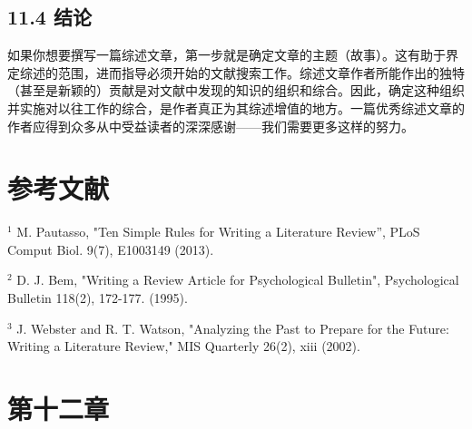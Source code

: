 \subsection*{11.4 结论}
如果你想要撰写一篇综述文章，第一步就是确定文章的主题（故事）。这有助于界定综述的范围，进而指导必须开始的文献搜索工作。综述文章作者所能作出的独特（甚至是新颖的）贡献是对文献中发现的知识的组织和综合。因此，确定这种组织并实施对以往工作的综合，是作者真正为其综述增值的地方。一篇优秀综述文章的作者应得到众多从中受益读者的深深感谢——我们需要更多这样的努力。

\section*{参考文献}
${ }^{1}$ M. Pautasso, "Ten Simple Rules for Writing a Literature Review”, PLoS Comput Biol. 9(7), E1003149 (2013).

${ }^{2}$ D. J. Bem, "Writing a Review Article for Psychological Bulletin", Psychological Bulletin 118(2), 172-177. (1995).

${ }^{3}$ J. Webster and R. T. Watson, "Analyzing the Past to Prepare for the Future: Writing a Literature Review," MIS Quarterly 26(2), xiii (2002).

\section*{第十二章}
